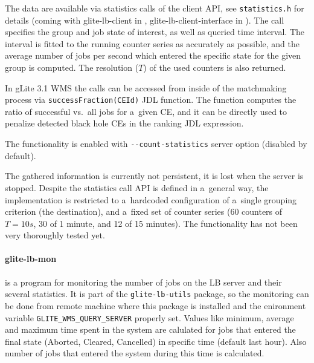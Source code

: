 The data are available via statistics calls of the client API,
see \verb'statistics.h' for details (coming with glite-lb-client in ,
glite-lb-client-interface in ).
The call specifies the group and job state of interest, as well as queried
time interval.
The interval is fitted to the running counter series as accurately as possible,
and the average number of jobs per second which entered the specific state for
the given group is computed.  The resolution ($T$) of the used counters is also
returned.

\begin{sloppypar}
In gLite 3.1 WMS the calls can be accessed from inside of the matchmaking process
via \verb'successFraction(CEId)'
JDL function.
The function computes the ratio of successful vs.\ all jobs for a~given CE,
and it can be directly used to penalize detected black hole CEs in the ranking
JDL expression.
\end{sloppypar}


The functionality is enabled with \verb'--count-statistics' \LB server option
(disabled by default).

The gathered information is currently not persistent, it is lost when the server is stopped.
Despite the statistics call API is defined in a~general way, the implementation is
restricted to a~hardcoded configuration of a~single grouping criterion (the destination),
and a~fixed set of counter series (60 counters of $T=10s$, 30 of 1 minute, and 12 of 15 minutes).
The functionality has not been very thoroughly tested yet.




\paragraph{glite-lb-mon} is a program for monitoring the number of jobs on the
LB server and their several statistics. It is part of the
\verb'glite-lb-utils' package, so the monitoring can be done from remote machine
where this package is installed and the enironment variable
\verb'GLITE_WMS_QUERY_SERVER' properly set. Values like minimum, average and
maximum time spent in the system are calulated for jobs that entered  the
final  state (Aborted,  Cleared,  Cancelled) in specific time (default last
hour). Also number of jobs that entered the system during this time is
calculated.

